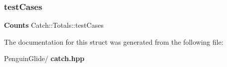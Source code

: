 \mbox{\label{struct_catch_1_1_totals_adb195fe477aedee2ecea88c888f16506}} 
\subsubsection{testCases}
{\footnotesize\ttfamily \textbf{ Counts} Catch\+::\+Totals\+::test\+Cases}



The documentation for this struct was generated from the following file\+:\begin{DoxyCompactItemize}
\item 
Penguin\+Glide/\textbf{ catch.\+hpp}\end{DoxyCompactItemize}
